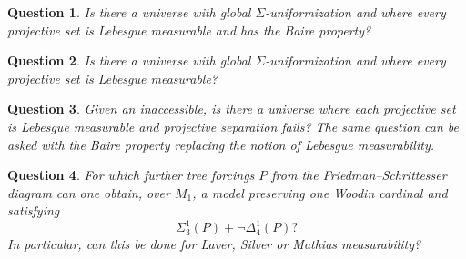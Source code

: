 \documentclass[a4paper,11pt]{article}
\newtheorem{question}{Question}
\begin{document}
\begin{question}
Is there a universe with global $\Sigma$-uniformization and where every projective set is Lebesgue measurable and has the Baire property?
\end{question}

\begin{question}
Is there a universe with global $\Sigma$-uniformization and where every projective set is Lebesgue measurable? 
\end{question}


\begin{question}
Given an inaccessible, is there a universe where each projective set is Lebesgue measurable and projective separation fails? The same question can be asked with the Baire property replacing the notion of Lebesgue measurability.
\end{question}

\begin{question}
For which further tree forcings $P$ from the Friedman--Schrittesser diagram
can one obtain, over $M_1$, a model preserving one Woodin cardinal and
satisfying
\[
\Sigma^1_3(P)+\neg\Delta^1_4(P)?
\]
In particular, can this be done for Laver, Silver or Mathias measurability?
\end{question}








\end{document}
